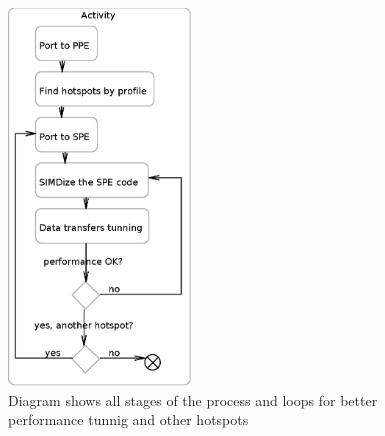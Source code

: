 \begin{figure}
    \centering
    \includegraphics[height=10cm]{data/portingCycle.eps}
    \caption[Application for CellBE porting process]{Diagram shows all stages of the process and loops for better performance tunnig and other hotspots}
    \label{fg:appPorting}
\end{figure}